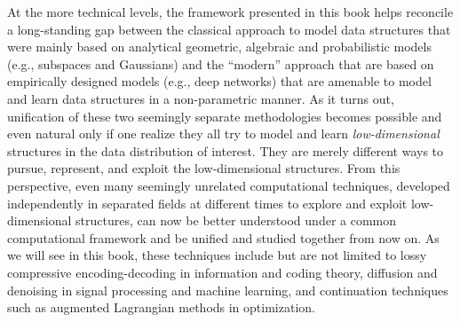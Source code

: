 \documentclass[../../book-main.tex]{subfiles}
\begin{document}
At the more technical levels, the framework presented in this book helps reconcile a long-standing gap between the classical approach to model data structures that were mainly based on analytical geometric, algebraic and probabilistic models (e.g., subspaces and Gaussians) and the ``modern'' approach that are based on empirically designed models (e.g., deep networks) that are amenable to model and learn data structures in a non-parametric manner. As it turns out, unification of these two seemingly separate methodologies becomes possible and even natural only if one realize they all try to model and learn {\em low-dimensional} structures in the data distribution of interest. They are merely different ways to pursue, represent, and exploit the low-dimensional structures. From this perspective, even many seemingly unrelated computational techniques, developed independently in separated fields at different times to explore and exploit low-dimensional structures, can now be better understood under a common computational framework and be unified and studied together from now on. As we will see in this book, these techniques include but are not limited to lossy compressive encoding-decoding in information and coding theory, diffusion and denoising in signal processing and machine learning, and continuation techniques such as augmented Lagrangian methods in optimization. 
\end{document}
